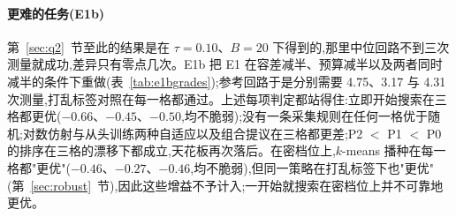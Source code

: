 \documentclass[11pt,a4paper]{ctexart}
\begin{document}
\paragraph{更难的任务(E1b)} 第~\ref{sec:q2}~节至此的结果是在 $\tau = 0.10$、$B = 20$ 下得到的,那里中位回路不到三次测量就成功,差异只有零点几次。E1b 把 E1 在容差减半、预算减半以及两者同时减半的条件下重做(表~\ref{tab:e1bgrades});参考回路于是分别需要 4.75、3.17 与 4.31 次测量,打乱标签对照在每一格都通过。上述每项判定都站得住:立即开始搜索在三格都更优($-0.66$、$-0.45$、$-0.50$,均不脆弱);没有一条采集规则在任何一格优于随机;对数仿射与从头训练两种自适应以及组合提议在三格都更差;P2 $<$ P1 $<$ P0 的排序在三格的漂移下都成立,天花板再次落后。在密档位上,$k$-means 播种在每一格都"更优"($-0.46$、$-0.27$、$-0.46$,均不脆弱),但同一策略在打乱标签下也"更优"(第~\ref{sec:robust}~节),因此这些增益不予计入;一开始就搜索在密档位上并不可靠地更优。
\end{document}
